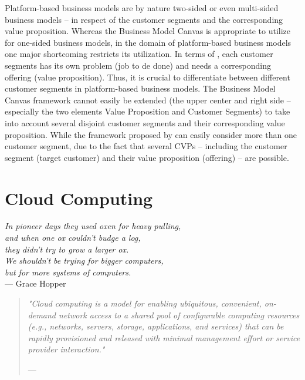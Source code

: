 Platform-based business models are by nature two-sided or even multi-sided business models -- in respect of the customer segments and the corresponding value proposition. Whereas the Business Model Canvas is appropriate to utilize for one-sided business models, in the domain of platform-based business models one major shortcoming restricts its utilization. In terms of \citet{Johnson2008}, each customer segments has its own problem (job to de done) and needs a corresponding offering (value proposition). Thus, it is crucial to differentiate between different customer segments in platform-based business models. The Business Model Canvas framework cannot easily be extended (the upper center and right side -- especially the two elements Value Proposition and Customer Segments) to take into account several disjoint customer segments and their corresponding value proposition. While the framework proposed by \citet{Johnson2008} can easily consider more than one customer segment, due to the fact that several \acp{CVP} -- including the customer segment (target customer) and their value proposition (offering) -- are possible.

\section{Cloud Computing}\label{ch:tf:paas}
\begin{flushright}{\slshape 
	In pioneer days they used oxen for heavy pulling,\\
	and when one ox couldn't budge a log,\\
	they didn't try to grow a larger ox.\\
	We shouldn't be trying for bigger computers,\\
	but for more systems of computers.} \\ \medskip
	--- Grace Hopper
\end{flushright}

\begin{quote}{\slshape 
"Cloud computing is a model for enabling ubiquitous, convenient, on-demand network access to a shared pool of configurable computing resources (e.g., networks, servers, storage, applications, and services) that can be rapidly provisioned and released with minimal management effort or service provider interaction."}
\vspace*{-5pt}
\begin{flushright}
	--- \citet[p. 2]{Mell2011}
\end{flushright}
\end{quote}

